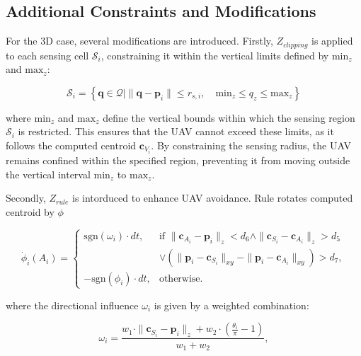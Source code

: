     \subsection{Additional Constraints and Modifications}
        For the 3D case, several modifications are introduced. 
        Firstly, $Z_{clipping}$ is applied to each sensing cell $\mathcal{S}_i$, constraining it within the vertical limits defined by $\text{min}_z$ and $\text{max}_z$:

        \begin{equation}
            \mathcal{S}_i = \left\{\mathbf{q} \in \mathcal{Q} \mid \|\mathbf{q} - \mathbf{p}_i\| \leq r_{s,i}, \quad \text{min}_z \leq q_z \leq \text{max}_z \right\}
        \end{equation}

        where $\text{min}_z$ and $\text{max}_z$ define the vertical bounds within which the sensing region $\mathcal{S}_i$ is restricted. 
        This ensures that the \ac{UAV} cannot exceed these limits, as it follows the computed centroid \( \mathbf{c}_{V_i} \). 
        By constraining the sensing radius, the \ac{UAV} remains confined within the specified region, preventing it from moving outside the vertical interval $\text{min}_z$ to $\text{max}_z$.

        Secondly, $Z_{rule}$ is intorduced to enhance \ac{UAV} avoidance. Rule rotates computed centroid by $\phi$

        \begin{equation}
            \dot{\phi}_i(A_i) =
            \begin{cases}
                \text{sgn}(\omega_i) \cdot dt, & \text{if } \|\mathbf{c}_{A_i} - \mathbf{p}_i\|_z < d_6 \land \|\mathbf{c}_{S_i} - \mathbf{c}_{A_i}\|_z > d_5 \\ 
                                               & \lor (\|\mathbf{p}_i - \mathbf{c}_{S_i}\|_{xy} - \|\mathbf{p}_i - \mathbf{c}_{A_i}\|_{xy}) > d_7, \\
                -\text{sgn}(\phi_i) \cdot dt,  & \text{otherwise.}
            \end{cases}
        \end{equation}
        
        where the directional influence \(\omega_i\) is given by a weighted combination:
        
        \begin{equation}
            \omega_i = \frac{w_1 \cdot \|\mathbf{c}_{S_i} - \mathbf{p}_i\|_z + w_2 \cdot \left(\frac{\theta_i}{\pi} - 1\right)}{w_1 + w_2},
        \end{equation}
        
